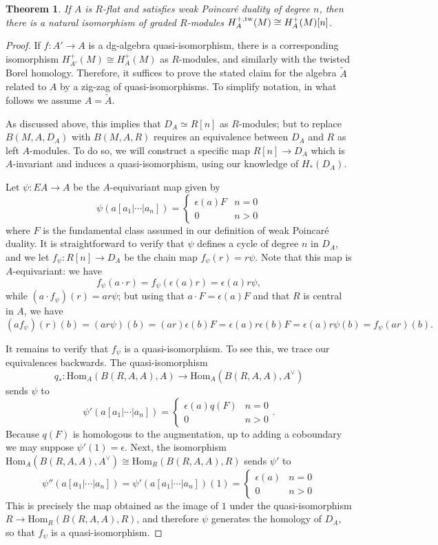 \documentclass{memo-l}
\newtheorem{theorem}{Theorem}[chapter]
\theoremstyle{definition}
\theoremstyle{remark}
\numberwithin{section}{chapter}
\numberwithin{equation}{chapter}
\begin{document}
\begin{theorem}\label{PDiso-weak}
If $A$ is $R$-flat and satisfies weak Poincar\'e duality of degree $n$, then there is a natural isomorphism of graded $R$-modules $H^{+,\textup{tw}}_A(M) \cong H^+_A(M)[n]$. 
\end{theorem}
\begin{proof}
If $f: A' \to A$ is a dg-algebra quasi-isomorphism, there is a corresponding isomorphism $H^+_{A'}(M) \cong H^+_A(M)$ as $R$-modules, and similarly with the twisted Borel homology. Therefore, it suffices to prove the stated claim for the algebra $\tilde A$ related to $A$ by a zig-zag of quasi-isomorphisms. To simplify notation, in what follows we assume $A = \tilde A$.

As discussed above, this implies that $D_A \simeq R[n]$ as $R$-modules; but to replace $B(M, A, D_A)$ with $B(M, A, R)$ requires an equivalence between $D_A$ and $R$ as left $A$-modules. To do so, we will construct a specific map $R[n] \to D_A$ which is $A$-invariant and induces a quasi-isomorphism, using our knowledge of $H_*(D_A)$. 

Let $\psi: EA \to A$ be the $A$-equivariant map given by $$\psi(a[a_1 | \cdots | a_n]) = \begin{cases} \epsilon(a) F & n = 0 \\ 0 & n > 0 \end{cases}$$ where $F$ is the fundamental class assumed in our definition of weak Poincar\'e duality. It is straightforward to verify that $\psi$ defines a cycle of degree $n$ in $D_A$, and we let $f_\psi: R[n] \to D_A$ be the chain map $f_\psi(r) = r\psi$. Note that this map is $A$-equivariant: we have $$f_\psi(a \cdot r) = f_\psi(\epsilon(a) r) = \epsilon(a) r \psi,$$ while $(a \cdot f_\psi)(r) = a r\psi$; but using that $a \cdot F = \epsilon(a) F$ and that $R$ is central in $A$, we have $$(a f_\psi)(r)(b) = (ar\psi)(b) = (ar)\epsilon(b) F = \epsilon(a) r \epsilon(b) F = \epsilon(a) r \psi(b) = f_\psi(ar)(b).$$

It remains to verify that $f_\psi$ is a quasi-isomorphism. To see this, we trace our equivalences backwards. The quasi-isomorphism $$q_*: \text{Hom}_A(B(R, A, A), A) \to \text{Hom}_A(B(R, A, A), A^\vee)$$ sends $\psi$ to $$\psi'(a[a_1 | \cdots | a_n]) = \begin{cases} \epsilon(a) q(F) & n = 0 \\ 0 & n > 0 \end{cases}.$$ Because $q(F)$ is homologous to the augmentation, up to adding a coboundary we may suppose $\psi'(1) = \epsilon$. Next, the isomorphism $\text{Hom}_A(B(R,A,A), A^\vee) \cong \text{Hom}_R(B(R,A,A), R)$ sends $\psi'$ to $$\psi''(a[a_1 | \cdots | a_n]) = \psi'(a[a_1 | \cdots | a_n])(1) = \begin{cases} \epsilon(a) & n = 0 \\ 0 & n > 0 \end{cases}$$ This is precisely the map obtained as the image of $1$ under the quasi-isomorphism $R \to \text{Hom}_R(B(R,A,A), R)$, and therefore $\psi$ generates the homology of $D_A$, so that $f_\psi$ is a quasi-isomorphism.


\end{proof}
\end{document}
